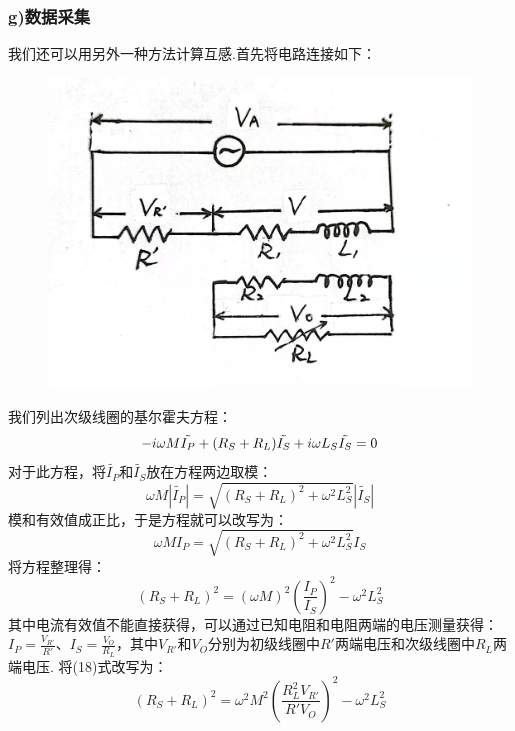 \documentclass[UTF8]{ctexart}
\begin{document}
\subsubsection*{g)数据采集}
我们还可以用另外一种方法计算互感.首先将电路连接如下：
\begin{figure}[H]\begin{center}
    \includegraphics*[scale = 0.1]{6.jpg}
\end{center}\end{figure}
\vspace{-2em}
我们列出次级线圈的基尔霍夫方程：
\begin{equation}
    -i\omega M \tilde{I_P}+(R_S+R_L)\tilde{I_S}+i\omega L_S\tilde{I_S}=0\\
\end{equation}
对于此方程，将$\tilde{I_P}$和$\tilde{I_S}$放在方程两边取模：
\begin{equation}
    \omega M |\tilde{I_P}|=\sqrt{(R_S+R_L)^2+\omega^2L_S^2}|\tilde{I_S}|
\end{equation}
模和有效值成正比，于是方程就可以改写为：
\begin{equation}
    \label{shiliu}
    \omega M I_P=\sqrt{(R_S+R_L)^2+\omega^2L_S^2}I_S
\end{equation}
将方程整理得：
\begin{equation}
    (R_S+R_L)^2=(\omega M)^2(\frac{I_P}{I_S})^2-\omega^2L_S^2
\end{equation}
其中电流有效值不能直接获得，可以通过已知电阻和电阻两端的电压测量获得：$I_P=\frac{V_{R'}}{R'}$、$I_S=\frac{V_O}{R_L}$，其中$V_{R'}$和$V_O$分别为初级线圈中$R'$两端电压和次级线圈中$R_L$两端电压.
将(18)式改写为：
\begin{equation}
    \label{shiba}
    (R_S+R_L)^2=\omega^2  M^2 (\frac{R_L^2V_{R'}}{R'V_O})^2-\omega^2L_S^2
\end{equation}
\end{document}
